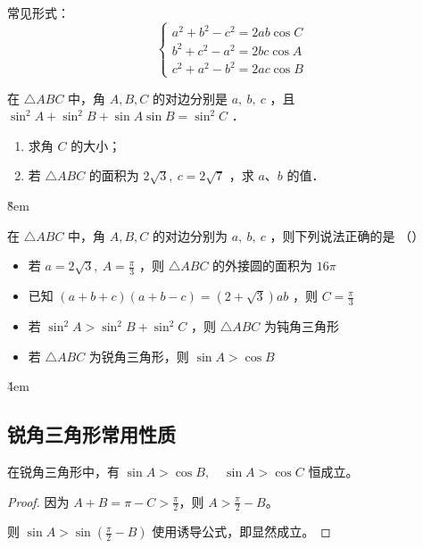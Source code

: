 \begin{theorem}
    常见形式：
    $$\begin{cases}
            a^2 + b^2 - c^2 = 2ab \cos C \\
            b^2 + c^2 - a^2 = 2bc \cos A \\
            c^2 + a^2 - b^2 = 2ac \cos B
        \end{cases}$$
\end{theorem}

\begin{example}
    在 $\triangle A B C$ 中，角 $A, B, C$ 的对边分别是 $a, ~ b, ~ c$ ，且 $\sin ^2 A+\sin ^2 B+\sin A \sin B=\sin ^2 C$ ．
    \begin{enumerate}
        \item 求角 $C$ 的大小；
        \item 若 $\triangle A B C$ 的面积为 $2 \sqrt{3}, ~ c=2 \sqrt{7}$ ，求 $a$、$b$ 的值．
    \end{enumerate}
\end{example}
\v{8em}

\begin{example}
    在 $\triangle A B C$ 中，角 $A, B, C$ 的对边分别为 $a, ~ b, ~ c$ ，则下列说法正确的是 （\qquad）
    \begin{itemize}
        \item 若 $a=2 \sqrt{3}, ~ A=\frac{\pi}{3}$ ，则 $\triangle A B C$ 的外接圆的面积为 $16 \pi$
        \item 已知 $(a+b+c)(a+b-c)=(2+\sqrt{3}) a b$ ，则 $C=\frac{\pi}{3}$
        \item 若 $\sin ^2 A>\sin ^2 B+\sin ^2 C$ ，则 $\triangle A B C$ 为钝角三角形
        \item 若 $\triangle A B C$ 为锐角三角形，则 $\sin A>\cos B$
    \end{itemize}
\end{example}

\v{4em}

\subsection{锐角三角形常用性质}

\begin{theorem}
    在锐角三角形中，有 $\sin A > \cos B, \quad \sin A > \cos C$ 恒成立。
\end{theorem}

\begin{proof}
    因为 $A + B = \pi - C > \frac{\pi}{2}$，则 $A > \frac{\pi}{2} - B$。

    则 $\sin A > \sin (\frac{\pi}{2} - B)$ 使用诱导公式，即显然成立。
\end{proof}

